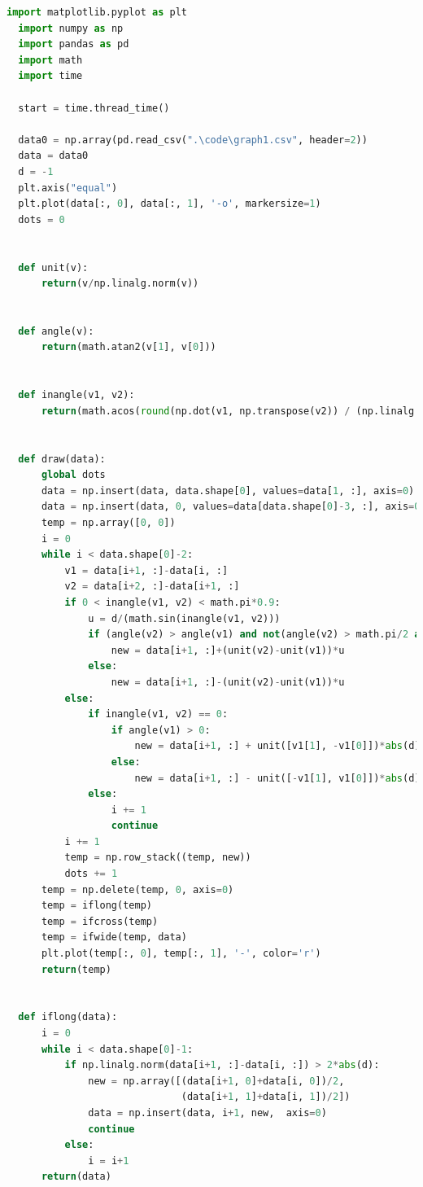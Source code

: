 \documentclass{apmcmthesis}
\begin{document}
\begin{lstlisting}[language=Python,caption={The python source code of zigzag hatch}]
  import matplotlib.pyplot as plt
  import numpy as np
  import pandas as pd
  import math
  import time
  
  start = time.thread_time()
  
  data0 = np.array(pd.read_csv(".\code\graph1.csv", header=2))
  data = data0  
  d = -1  
  plt.axis("equal")
  plt.plot(data[:, 0], data[:, 1], '-o', markersize=1)
  dots = 0
  
  
  def unit(v):  
      return(v/np.linalg.norm(v))
  
  
  def angle(v):  
      return(math.atan2(v[1], v[0]))
  
  
  def inangle(v1, v2):  
      return(math.acos(round(np.dot(v1, np.transpose(v2)) / (np.linalg.norm(v1)*np.linalg.norm(v2)), 9)))
  
  
  def draw(data):  
      global dots
      data = np.insert(data, data.shape[0], values=data[1, :], axis=0)
      data = np.insert(data, 0, values=data[data.shape[0]-3, :], axis=0)
      temp = np.array([0, 0])
      i = 0
      while i < data.shape[0]-2:
          v1 = data[i+1, :]-data[i, :]
          v2 = data[i+2, :]-data[i+1, :]
          if 0 < inangle(v1, v2) < math.pi*0.9:  
              u = d/(math.sin(inangle(v1, v2)))
              if (angle(v2) > angle(v1) and not(angle(v2) > math.pi/2 and angle(v1) < -math.pi/2)) or (angle(v2) < -math.pi/2 and angle(v1) > math.pi/2):
                  new = data[i+1, :]+(unit(v2)-unit(v1))*u
              else:
                  new = data[i+1, :]-(unit(v2)-unit(v1))*u
          else:
              if inangle(v1, v2) == 0:  
                  if angle(v1) > 0:
                      new = data[i+1, :] + unit([v1[1], -v1[0]])*abs(d)
                  else:
                      new = data[i+1, :] - unit([-v1[1], v1[0]])*abs(d)
              else:  
                  i += 1
                  continue
          i += 1
          temp = np.row_stack((temp, new))
          dots += 1
      temp = np.delete(temp, 0, axis=0)
      temp = iflong(temp)  
      temp = ifcross(temp)  
      temp = ifwide(temp, data)  
      plt.plot(temp[:, 0], temp[:, 1], '-', color='r')
      return(temp)
  
  
  def iflong(data):  
      i = 0
      while i < data.shape[0]-1:  
          if np.linalg.norm(data[i+1, :]-data[i, :]) > 2*abs(d):  
              new = np.array([(data[i+1, 0]+data[i, 0])/2,
                              (data[i+1, 1]+data[i, 1])/2])
              data = np.insert(data, i+1, new,  axis=0)
              continue
          else:
              i = i+1
      return(data)
  

\end{lstlisting}
\end{document}

